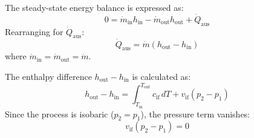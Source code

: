 The steady-state energy balance is expressed as:  
\[
0 = \dot{m}_{\text{in}} h_{\text{in}} - \dot{m}_{\text{out}} h_{\text{out}} + \dot{Q}_{\text{aus}}
\]  
Rearranging for \( \dot{Q}_{\text{aus}} \):  
\[
\dot{Q}_{\text{aus}} = \dot{m} (h_{\text{out}} - h_{\text{in}})
\]  
where \( \dot{m}_{\text{in}} = \dot{m}_{\text{out}} = \dot{m} \).  

The enthalpy difference \( h_{\text{out}} - h_{\text{in}} \) is calculated as:  
\[
h_{\text{out}} - h_{\text{in}} = \int_{T_{\text{in}}}^{T_{\text{out}}} c_{\text{if}} \, dT + v_{\text{if}} (p_2 - p_1)
\]  
Since the process is isobaric (\( p_2 = p_1 \)), the pressure term vanishes:  
\[
v_{\text{if}} (p_2 - p_1) = 0
\]
